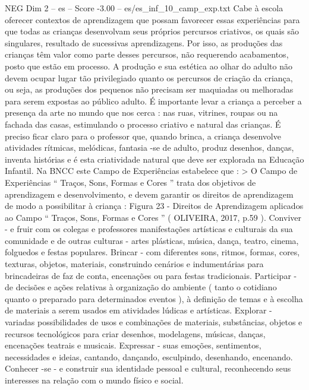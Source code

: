 \begin{textsample}{NEG Dim 2 – es – Score -3.00 – es/es\_inf\_10\_camp\_exp.txt}
Cabe à escola oferecer contextos de aprendizagem que possam favorecer essas experiências para que todas as crianças desenvolvam seus próprios percursos criativos, os quais são singulares, resultado de sucessivas aprendizagens.
Por isso, as produções das crianças têm valor como parte desses percursos, não requerendo acabamentos, posto que estão em processo.
A produção e sua estética ao olhar do adulto não devem ocupar lugar tão privilegiado quanto os percursos de criação da criança, ou seja, as produções dos pequenos não precisam ser maquiadas ou melhoradas para serem expostas ao público adulto.
É importante levar a criança a perceber a presença da arte no mundo que nos cerca : nas ruas, vitrines, roupas ou na fachada das casas, estimulando o processo criativo e natural das crianças.
É preciso ficar claro para o professor que, quando brinca, a criança desenvolve atividades rítmicas, melódicas, fantasia -se de adulto, produz desenhos, danças, inventa histórias e é esta criatividade natural que deve ser explorada na Educação Infantil.
Na BNCC este Campo de Experiências estabelece que : > O Campo de Experiências “ Traços, Sons, Formas e Cores ” trata dos objetivos de aprendizagem e desenvolvimento, e devem garantir os direitos de aprendizagem de modo a possibilitar à criança : Figura 23 - Direitos de Aprendizagem aplicados ao Campo “ Traços, Sons, Formas e Cores ” ( OLIVEIRA, 2017, p.59 ).
Conviver - e fruir com os colegas e professores manifestações artísticas e culturais da sua comunidade e de outras culturas - artes plásticas, música, dança, teatro, cinema, folguedos e festas populares.
Brincar - com diferentes sons, ritmos, formas, cores, texturas, objetos, materiais, construindo cenários e indumentárias para brincadeiras de faz de conta, encenações ou para festas tradicionais.
Participar - de decisões e ações relativas à organização do ambiente ( tanto o cotidiano quanto o preparado para determinados eventos ), à definição de temas e à escolha de materiais a serem usados em atividades lúdicas e artísticas.
Explorar - variadas possibilidades de usos e combinações de materiais, substâncias, objetos e recursos tecnológicos para criar desenhos, modelagens, músicas, danças, encenações teatrais e musicais.
Expressar - suas emoções, sentimentos, necessidades e ideias, cantando, dançando, esculpindo, desenhando, encenando.
Conhecer -se - e construir sua identidade pessoal e cultural, reconhecendo seus interesses na relação com o mundo físico e social.

\end{textsample}
